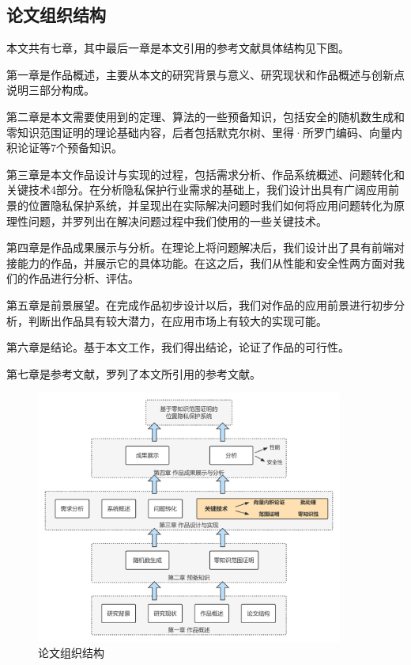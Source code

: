 \documentclass[zihao=-4]{ctexart}
\begin{document}
\subsection{论文组织结构}
本文共有七章，其中最后一章是本文引用的参考文献具体结构见下图。
\par 
第一章是作品概述，主要从本文的研究背景与意义、研究现状和作品概述与创新点说明三部分构成。
\par 
第二章是本文需要使用到的定理、算法的一些预备知识，包括安全的随机数生成和零知识范围证明的理论基础内容，后者包括默克尔树、里得·所罗门编码、向量内积论证等7个预备知识。
\par 
第三章是本文作品设计与实现的过程，包括需求分析、作品系统概述、问题转化和关键技术4部分。在分析隐私保护行业需求的基础上，我们设计出具有广阔应用前景的位置隐私保护系统，并呈现出在实际解决问题时我们如何将应用问题转化为原理性问题，并罗列出在解决问题过程中我们使用的一些关键技术。
\par 
第四章是作品成果展示与分析。在理论上将问题解决后，我们设计出了具有前端对接能力的作品，并展示它的具体功能。在这之后，我们从性能和安全性两方面对我们的作品进行分析、评估。
\par 
第五章是前景展望。在完成作品初步设计以后，我们对作品的应用前景进行初步分析，判断出作品具有较大潜力，在应用市场上有较大的实现可能。
\par 
第六章是结论。基于本文工作，我们得出结论，论证了作品的可行性。
\par 
第七章是参考文献，罗列了本文所引用的参考文献。

\begin{figure}[H] %
	\centering %
	\includegraphics[width=0.9\textwidth]{./include_picture/2023冯如杯-论文组织结构} %
	\caption{论文组织结构} %
	\label{论文组织结构} %
\end{figure}
\end{document}
